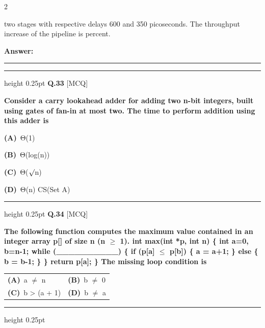\documentclass[a4paper,10pt,twoside]{article}
\begin{document}
\begin{multicols}{2}
{two stages with respective delays 600 and 350 picoseconds. The throughput increase of the
pipeline is
percent. \par}
\par\vspace{3pt}\noindent\textbf{Answer:} \rule{3.2cm}{0.4pt}
\par\vspace{6pt}\hrule height 0.25pt\vspace{6pt}
\noindent\textbf{Q.33} \hfill {\footnotesize\textsf{[MCQ]}}
\par\vspace{2pt}
{\bfseries Consider a carry lookahead adder for adding two n-bit integers, built using gates of fan-in at
most two. The time to perform addition using this adder is \par}
\par\vspace{2pt}\noindent
\textbf{(A)}~Θ(1)\par\vspace{2pt}\noindent
\textbf{(B)}~Θ(log(n))\par\vspace{2pt}\noindent
\textbf{(C)}~Θ($\sqrt{\vphantom{x}}$n)\par\vspace{2pt}\noindent
\textbf{(D)}~Θ(n) \newline CS(Set A)
\par\vspace{6pt}\hrule height 0.25pt\vspace{6pt}
\noindent\textbf{Q.34} \hfill {\footnotesize\textsf{[MCQ]}}
\par\vspace{2pt}
{\bfseries The following function computes the maximum value contained in an integer array p[] of size
n (n $\ge$ 1).
int max(int *p, int n) \{
int a=0, b=n-1;
while (\_\_\_\_\_\_\_\_\_\_) \{
if (p[a] $\le$ p[b]) \{ a = a+1; \}
else
\{ b = b-1; \}
\}
return p[a];
\}
The missing loop condition is \par}
\par\vspace{2pt}\noindent
\begin{tabular*}{\columnwidth}{@{\extracolsep{\fill}}p{}p{}@{}}
\textbf{(A)}~a $\ne$ n & \textbf{(B)}~b $\ne$ 0 \\
\addlinespace[2pt]
\textbf{(C)}~b > (a + 1) & \textbf{(D)}~b $\ne$ a
\end{tabular*}
\par\vspace{6pt}\hrule height 0.25pt\vspace{6pt}

\end{multicols}
\end{document}
